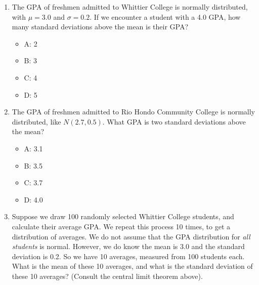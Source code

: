 \documentclass{article}
\begin{document}
\begin{enumerate}
\item The GPA of freshmen admitted to Whittier College is normally distributed, with $\mu = 3.0$ and $\sigma = 0.2$.  If we encounter a student with a 4.0 GPA, how many standard deviations above the mean is their GPA?
\begin{itemize}
\item A: 2
\item B: 3
\item C: 4
\item D: 5
\end{itemize}
\item The GPA of freshmen admitted to Rio Hondo Community College is normally distributed, like $N(2.7,0.5)$.  What GPA is two standard deviations above the mean?
\begin{itemize}
\item A: 3.1
\item B: 3.5
\item C: 3.7
\item D: 4.0
\end{itemize}
\item Suppose we draw 100 randomly selected Whittier College students, and calculate their average GPA.  We repeat this process 10 times, to get a distribution of averages.  We do not assume that the GPA distribution for \textit{all students} is normal.  However, we do know the mean is 3.0 and the standard deviation is 0.2.  So we have 10 averages, measured from 100 students each.  What is the mean of these 10 averages, and what is the standard deviation of these 10 averages? (Consult the central limit theorem above).
\end{enumerate}
\end{document}
